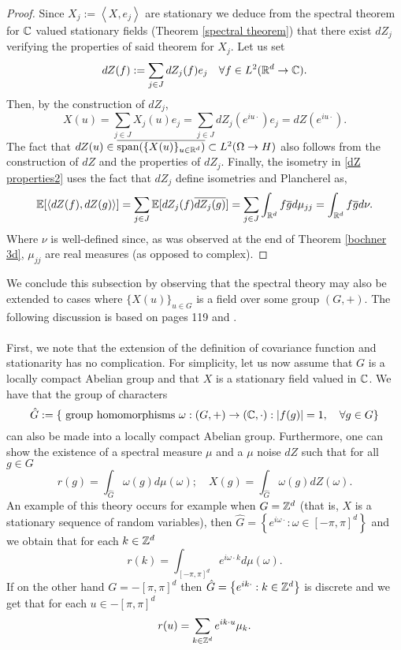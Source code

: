 \documentclass[12pt]{article}
\newcommand{\br}[1]{\left\langle#1\right\rangle}
\begin{document}
\begin{proof}
    Since $X_j:=\br{X,e_j}$ are stationary we deduce from the spectral theorem for $\mathbb{C}$ valued stationary fields (Theorem \ref{spectral theorem}) that there exist $dZ_j$ verifying the properties of said theorem for $X_j$. Let us set
    \begin{equation*}
        dZ(f):=\sum_{j\in J}dZ_j(f)e_j\quad\forall f\in L^2({\mathbb R}^d\to\mathbb{C}).
    \end{equation*}
    Then, by the construction of $dZ_j$,
    \begin{equation*}
        X(u)=\sum_{j\in J}X_j(u) e_j=\sum_{j\in J}dZ_j(e^{iu\cdot})e_j=dZ(e^{iu\cdot}).
    \end{equation*}
    The fact that $dZ(u)\in \overline{\text{span}(\{X(u)\}_{u\in{\mathbb R}^d})}\subset L^2(\Omega\to H)$ also follows from the construction of $dZ$ and the properties of $dZ_j$. Finally, the isometry in \eqref{dZ properties2} uses the fact that $dZ_j$ define isometries and Plancherel as,
    \begin{equation*}
        \E[\br{dZ(f),{dZ(g)}}]=\sum_{j\in J}\E[dZ_j(f)\overline{dZ_j(g)}]=\sum_{j\in J}\int_{\R^d}f\overline{g} d\mu_{jj}=\int_{\R^d}f\overline{g} d\nu.
    \end{equation*}
    Where $\nu$ is well-defined since, as was observed at the end of Theorem \ref{bochner 3d}, $\mu_{jj}$ are real measures (as opposed to complex).
\end{proof}
We conclude this subsection by observing that the spectral theory may also be extended to cases where $\{X(u)\}_{u\in G}$ is a field over some group $(G,+)$. The following discussion is based on \cite{adler2007random} pages 119 and \cite{yaglom1961second}. \\
\\
First, we note that the extension of the definition of covariance function and stationarity has no complication. For simplicity, let us now assume that $G$ is a locally compact Abelian group and that $X$ is a stationary field valued in $\mathbb{C}$. We have that the group of characters
$$\hat{G}:=\{\text{ group homomorphisms } \omega:(G,+)\to(\mathbb{C},\cdot): \abs{f(g)}=1,\quad\forall g\in G\}$$ can also be made into a locally compact Abelian group. Furthermore, one can show the existence of a spectral measure $\mu$ and a $\mu$ noise $dZ$ such that for all $g\in G$
\begin{equation*}
    r(g)=\int_{\hat{G}}\omega(g)d\mu(\omega);\quad X(g)=\int_{\hat{G}}\omega(g)dZ(\omega).
\end{equation*}
An example of this theory occurs for example when $G={\mathbb Z}^d$ (that is, $X$ is a stationary sequence of random variables), then
$
    \hat{G}=\left\{e^{i\omega \cdot}:\omega\in[-\pi,\pi]^d\right\}
$
and we obtain that for each $k\in{\mathbb Z}^d$
\begin{equation*}
    r(k)=\int_{[-\pi,\pi]^d}e^{i\omega \cdot k}d\mu(\omega).
\end{equation*}
If on the other hand $G=-[\pi,\pi]^d$ then $
    \hat{G}=\left\{e^{ik \cdot}:k\in{\mathbb Z}^d\right\}
$ is discrete
and we get that for each $u\in-[\pi,\pi]^d $
\begin{equation*}
    r(u)=\sum_{k\in{\mathbb Z}^d}e^{ik \cdot u}\mu_k.
\end{equation*}
\end{document}
